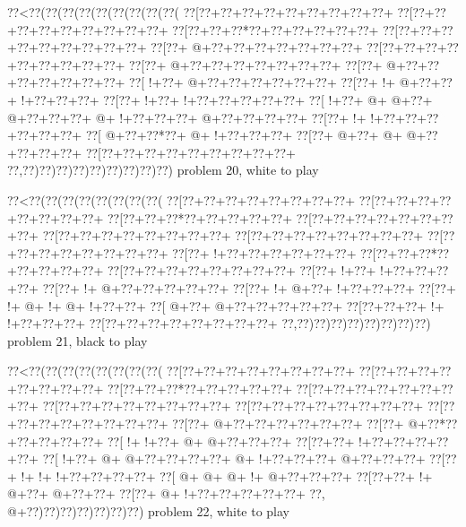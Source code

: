 \vbox{\vbox{\goo
\0??<\0??(\0??(\0??(\0??(\0??(\0??(\0??(\0??(\0??(
\0??[\0??+\0??+\0??+\0??+\0??+\0??+\0??+\0??+\0??+
\0??[\0??+\0??+\0??+\0??+\0??+\0??+\0??+\0??+\0??+
\0??[\0??+\0??+\0??*\0??+\0??+\0??+\0??+\0??+\0??+
\0??[\0??+\0??+\0??+\0??+\0??+\0??+\0??+\0??+\0??+
\0??[\0??+\- @+\0??+\0??+\0??+\0??+\0??+\0??+\0??+
\0??[\0??+\0??+\0??+\0??+\0??+\0??+\0??+\0??+\0??+
\0??[\0??+\- @+\0??+\0??+\0??+\0??+\0??+\0??+\0??+
\0??[\0??+\- @+\0??+\0??+\0??+\0??+\0??+\0??+\0??+
\0??[\- !+\0??+\- @+\0??+\0??+\0??+\0??+\0??+\0??+
\0??[\0??+\- !+\- @+\0??+\0??+\- !+\0??+\0??+\0??+
\0??[\0??+\- !+\0??+\- !+\0??+\0??+\0??+\0??+\0??+
\0??[\- !+\0??+\- @+\- @+\0??+\- @+\0??+\0??+\0??+
\- @+\- !+\0??+\0??+\0??+\- @+\0??+\0??+\0??+\0??+
\0??[\0??+\- !+\- !+\0??+\0??+\0??+\0??+\0??+\0??+
\0??[\- @+\0??+\0??*\0??+\- @+\- !+\0??+\0??+\0??+
\0??[\0??+\- @+\0??+\- @+\- @+\0??+\0??+\0??+\0??+
\0??[\0??+\0??+\0??+\0??+\0??+\0??+\0??+\0??+\0??+
\0??,\0??)\0??)\0??)\0??)\0??)\0??)\0??)\0??)\0??)
}
\hfil problem 20, white to play\hfil\break
}

\vbox{\vbox{\goo
\0??<\0??(\0??(\0??(\0??(\0??(\0??(\0??(\0??(
\0??[\0??+\0??+\0??+\0??+\0??+\0??+\0??+\0??+
\0??[\0??+\0??+\0??+\0??+\0??+\0??+\0??+\0??+
\0??[\0??+\0??+\0??*\0??+\0??+\0??+\0??+\0??+
\0??[\0??+\0??+\0??+\0??+\0??+\0??+\0??+\0??+
\0??[\0??+\0??+\0??+\0??+\0??+\0??+\0??+\0??+
\0??[\0??+\0??+\0??+\0??+\0??+\0??+\0??+\0??+
\0??[\0??+\0??+\0??+\0??+\0??+\0??+\0??+\0??+
\0??[\0??+\- !+\0??+\0??+\0??+\0??+\0??+\0??+
\0??[\0??+\0??+\0??*\0??+\0??+\0??+\0??+\0??+
\0??[\0??+\0??+\0??+\0??+\0??+\0??+\0??+\0??+
\0??[\0??+\- !+\0??+\- !+\0??+\0??+\0??+\0??+
\0??[\0??+\- !+\- @+\0??+\0??+\0??+\0??+\0??+
\0??[\0??+\- !+\- @+\0??+\- !+\0??+\0??+\0??+
\0??[\0??+\- !+\- @+\- !+\- @+\- !+\0??+\0??+
\0??[\- @+\0??+\- @+\0??+\0??+\0??+\0??+\0??+
\0??[\0??+\0??+\0??+\- !+\- !+\0??+\0??+\0??+
\0??[\0??+\0??+\0??+\0??+\0??+\0??+\0??+\0??+
\0??,\0??)\0??)\0??)\0??)\0??)\0??)\0??)\0??)
}
\hfil problem 21, black to play\hfil\break
}

\vbox{\vbox{\goo
\0??<\0??(\0??(\0??(\0??(\0??(\0??(\0??(\0??(
\0??[\0??+\0??+\0??+\0??+\0??+\0??+\0??+\0??+
\0??[\0??+\0??+\0??+\0??+\0??+\0??+\0??+\0??+
\0??[\0??+\0??+\0??*\0??+\0??+\0??+\0??+\0??+
\0??[\0??+\0??+\0??+\0??+\0??+\0??+\0??+\0??+
\0??[\0??+\0??+\0??+\0??+\0??+\0??+\0??+\0??+
\0??[\0??+\0??+\0??+\0??+\0??+\0??+\0??+\0??+
\0??[\0??+\0??+\0??+\0??+\0??+\0??+\0??+\0??+
\0??[\0??+\- @+\0??+\0??+\0??+\0??+\0??+\0??+
\0??[\0??+\- @+\0??*\0??+\0??+\0??+\0??+\0??+
\0??[\- !+\- !+\0??+\- @+\- @+\0??+\0??+\0??+
\0??[\0??+\0??+\- !+\0??+\0??+\0??+\0??+\0??+
\0??[\- !+\0??+\- @+\- @+\0??+\0??+\0??+\0??+
\- @+\- !+\0??+\0??+\0??+\- @+\0??+\0??+\0??+
\0??[\0??+\- !+\- !+\- !+\0??+\0??+\0??+\0??+
\0??[\- @+\- @+\- @+\- !+\- @+\0??+\0??+\0??+
\0??[\0??+\0??+\- !+\- @+\0??+\- @+\0??+\0??+
\0??[\0??+\- @+\- !+\0??+\0??+\0??+\0??+\0??+
\0??,\- @+\0??)\0??)\0??)\0??)\0??)\0??)\0??)
}
\hfil problem 22, white to play\hfil\break
}


